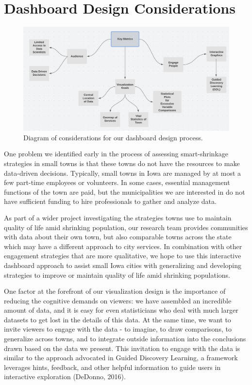 \documentclass[print]{nuthesis}
\begin{document}
\hypertarget{dashboard-design-considerations}{%
\section{Dashboard Design Considerations}\label{dashboard-design-considerations}}

\begin{figure}
\includegraphics[width=.8\textwidth]{figure/Key_Metrics}
\caption{Diagram of considerations for our dashboard design process.}\label{fig:metrics}
\end{figure}

One problem we identified early in the process of assessing smart-shrinkage strategies in small towns is that these towns do not have the resources to make data-driven decisions. Typically, small towns in Iowa are managed by at most a few part-time employees or volunteers. In some cases, essential management functions of the town are paid, but the municipalities we are interested in do not have sufficient funding to hire professionals to gather and analyze data.

As part of a wider project investigating the strategies towns use to maintain quality of life amid shrinking population, our research team provides communities with data about their own town, but also comparable towns across the state which may have a different approach to city services. In combination with other engagement strategies that are more qualitative, we hope to use this interactive dashboard approach to assist small Iowa cities with generalizing and developing strategies to improve or maintain quality of life amid shrinking populations.

One factor at the forefront of our visualization design is the importance of reducing the cognitive demands on viewers: we have assembled an incredible amount of data, and it is easy for even statisticians who deal with much larger datasets to get lost in the details of this data. At the same time, we want to invite viewers to engage with the data - to imagine, to draw comparisons, to generalize across towns, and to integrate outside information into the conclusions drawn based on the data we present.
This invitation to engage with the data is similar to the approach advocated in Guided Discovery Learning, a framework leverages hints, feedback, and other helpful information to guide users in interactive exploration (DeDonno, 2016).
\end{document}
